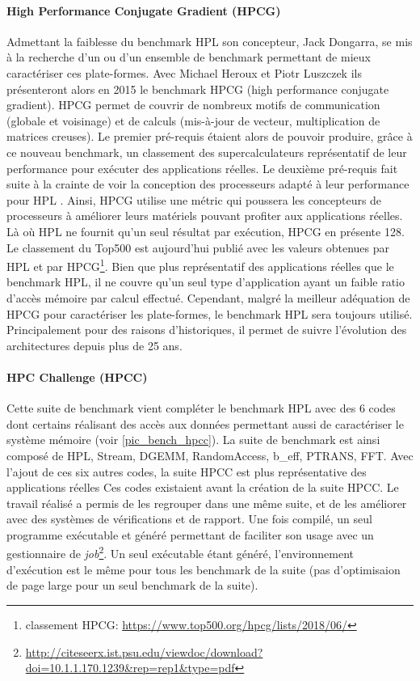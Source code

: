 \paragraph{High Performance Conjugate Gradient (HPCG) \cite{Dongarra2013}} 
Admettant la faiblesse du benchmark HPL son concepteur, Jack Dongarra, se mis à la recherche d'un ou d'un ensemble de benchmark permettant de mieux caractériser ces plate-formes. Avec Michael Heroux et Piotr Luszczek ils présenteront alors en 2015 le benchmark HPCG (high performance conjugate gradient). HPCG permet de couvrir de nombreux motifs de communication (globale et voisinage) et de calculs  (mis-à-jour de vecteur, multiplication de matrices creuses). 
Le premier pré-requis étaient alors de pouvoir produire, grâce à ce nouveau benchmark, un classement des supercalculateurs représentatif de leur performance pour exécuter des applications réelles. Le deuxième pré-requis fait suite à la crainte de voir la conception des processeurs adapté à leur performance pour HPL \cite{Dongarra2013}. Ainsi, HPCG utilise une métric qui poussera les concepteurs de processeurs à améliorer leurs matériels pouvant profiter aux applications réelles. Là où HPL ne fournit qu'un seul résultat par exécution, HPCG en présente 128. Le classement du Top500 est aujourd'hui publié avec les valeurs obtenues par HPL et par HPCG\footnote{classement HPCG: \url{https://www.top500.org/hpcg/lists/2018/06/}}. Bien que plus représentatif des applications réelles que le benchmark HPL, il ne couvre qu'un seul type d'application ayant un faible ratio d'accès mémoire par calcul effectué. Cependant, malgré la meilleur adéquation de HPCG pour caractériser les plate-formes, le benchmark HPL sera toujours utilisé. Principalement pour des raisons d'historiques, il permet de suivre l'évolution des architectures depuis plus de 25 ans. 





\paragraph{HPC Challenge (HPCC)} Cette suite de benchmark vient compléter le benchmark HPL avec des 6 codes dont certains réalisant des accès aux données permettant aussi de caractériser le système mémoire (voir \autoref{pic_bench_hpcc}). La suite de benchmark est ainsi composé de HPL, Stream, DGEMM, RandomAccess, b\_eff, PTRANS, FFT. Avec l'ajout de ces six autres codes, la suite HPCC est plus représentative des applications réelles Ces codes existaient avant la création de la suite HPCC. Le travail réalisé a permis de les regrouper dans une même suite, et de les améliorer avec des systèmes de vérifications et de rapport. Une fois compilé, un seul programme exécutable et généré permettant de faciliter son usage avec un gestionnaire de \textit{job}\footnote{\url{http://citeseerx.ist.psu.edu/viewdoc/download?doi=10.1.1.170.1239&rep=rep1&type=pdf}}. Un seul exécutable étant généré, l'environnement d'exécution est le même pour tous les benchmark de la suite (pas d'optimisaion de page large pour un seul benchmark de la suite). 

